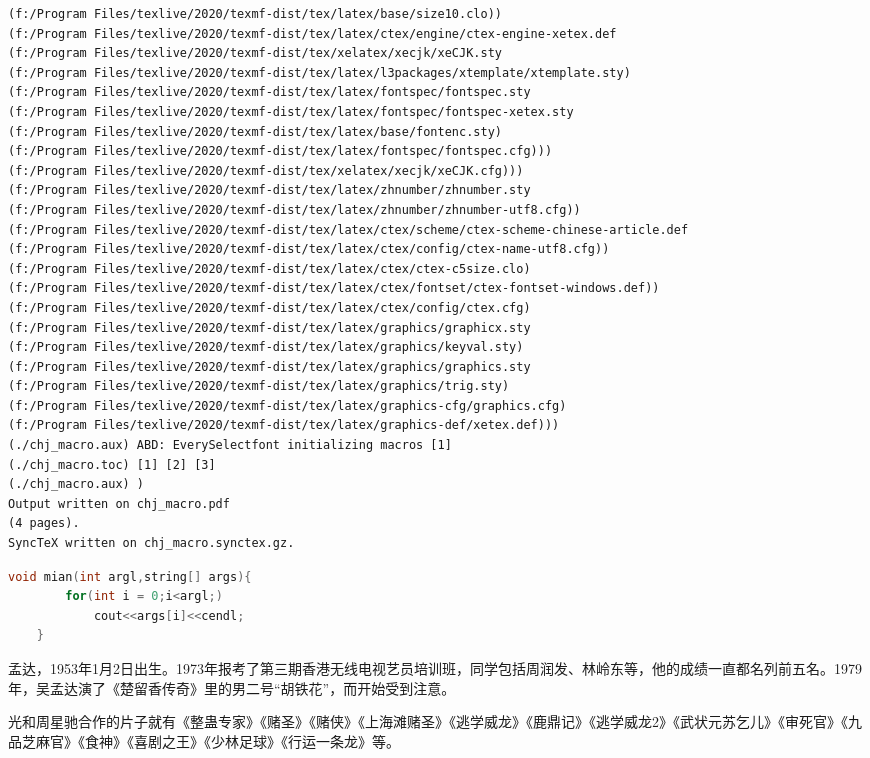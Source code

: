 \documentclass[UTF8]{ctexart}
\begin{document}
\begin{lstlisting}[language=xml]
(f:/Program Files/texlive/2020/texmf-dist/tex/latex/base/size10.clo))
(f:/Program Files/texlive/2020/texmf-dist/tex/latex/ctex/engine/ctex-engine-xetex.def
(f:/Program Files/texlive/2020/texmf-dist/tex/xelatex/xecjk/xeCJK.sty
(f:/Program Files/texlive/2020/texmf-dist/tex/latex/l3packages/xtemplate/xtemplate.sty)
(f:/Program Files/texlive/2020/texmf-dist/tex/latex/fontspec/fontspec.sty
(f:/Program Files/texlive/2020/texmf-dist/tex/latex/fontspec/fontspec-xetex.sty
(f:/Program Files/texlive/2020/texmf-dist/tex/latex/base/fontenc.sty)
(f:/Program Files/texlive/2020/texmf-dist/tex/latex/fontspec/fontspec.cfg)))
(f:/Program Files/texlive/2020/texmf-dist/tex/xelatex/xecjk/xeCJK.cfg)))
(f:/Program Files/texlive/2020/texmf-dist/tex/latex/zhnumber/zhnumber.sty
(f:/Program Files/texlive/2020/texmf-dist/tex/latex/zhnumber/zhnumber-utf8.cfg))
(f:/Program Files/texlive/2020/texmf-dist/tex/latex/ctex/scheme/ctex-scheme-chinese-article.def
(f:/Program Files/texlive/2020/texmf-dist/tex/latex/ctex/config/ctex-name-utf8.cfg))
(f:/Program Files/texlive/2020/texmf-dist/tex/latex/ctex/ctex-c5size.clo)
(f:/Program Files/texlive/2020/texmf-dist/tex/latex/ctex/fontset/ctex-fontset-windows.def))
(f:/Program Files/texlive/2020/texmf-dist/tex/latex/ctex/config/ctex.cfg)
(f:/Program Files/texlive/2020/texmf-dist/tex/latex/graphics/graphicx.sty
(f:/Program Files/texlive/2020/texmf-dist/tex/latex/graphics/keyval.sty)
(f:/Program Files/texlive/2020/texmf-dist/tex/latex/graphics/graphics.sty
(f:/Program Files/texlive/2020/texmf-dist/tex/latex/graphics/trig.sty)
(f:/Program Files/texlive/2020/texmf-dist/tex/latex/graphics-cfg/graphics.cfg)
(f:/Program Files/texlive/2020/texmf-dist/tex/latex/graphics-def/xetex.def)))
(./chj_macro.aux) ABD: EverySelectfont initializing macros [1]
(./chj_macro.toc) [1] [2] [3]
(./chj_macro.aux) )
Output written on chj_macro.pdf
(4 pages).
SyncTeX written on chj_macro.synctex.gz.

\end{lstlisting}


\begin{lstlisting}[language=c]
    void mian(int argl,string[] args){
        for(int i = 0;i<argl;)
            cout<<args[i]<<cendl;
    }
\end{lstlisting}



\begin{multicols}{2}  %
    孟达，1953年1月2日出生。1973年报考了第三期香港无线电视艺员培训班，同学包括周润发、林岭东等，他的成绩一直都名列前五名。1979年，吴孟达演了《楚留香传奇》里的男二号“胡铁花”，而开始受到注意。
\end{multicols}
\begin{multicols}{2}

    光和周星驰合作的片子就有《整蛊专家》《赌圣》《赌侠》《上海滩赌圣》《逃学威龙》《鹿鼎记》《逃学威龙2》《武状元苏乞儿》《审死官》《九品芝麻官》《食神》《喜剧之王》《少林足球》《行运一条龙》等。
\end{multicols}
\end{document}

